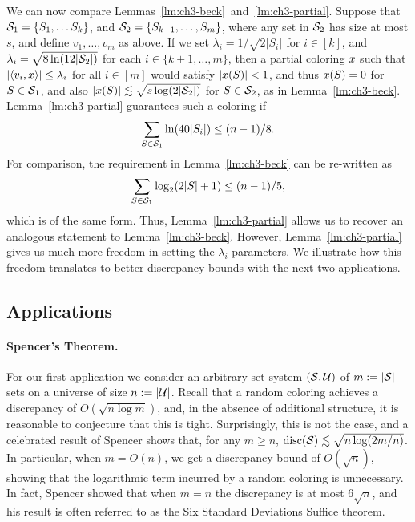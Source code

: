 We can now compare
Lemmas~\ref{lm:ch3-beck}~and~\ref{lm:ch3-partial}. Suppose that
$\mathcal{S}_1 = \{S_1, \ldots S_k\}$, and $\mathcal{S}_2 = \{S_{k+1}, \ldots, S_m\}$,
where any set in $\mathcal{S}_2$ has size at most $s$, and define
$v_1, \ldots, v_m$ as above. If we set
$\lambda_i = 1/\sqrt{2|S_i|}$ for $i \in [k]$, and
$\lambda_i = \sqrt{8\ln(12|\mathcal{S}_2|)}$ for each $i \in \{k+1, \ldots, m\}$, then a partial
coloring $x$ such that $|\langle v_i,x\rangle| \le \lambda_i$ for all
$i \in [m]$ would satisfy $|x(S)| < 1$, and thus
$x(S) = 0$ for $S \in \mathcal{S}_1$, and also
$|x(S)| \lesssim \sqrt{s \log(2|\mathcal{S}_2|)}$ for $S \in \mathcal{S}_2$, as
in Lemma~\ref{lm:ch3-beck}. Lemma~\ref{lm:ch3-partial} guarantees such
a coloring if
\[
  \sum_{S \in \mathcal{S}_1} \ln(40|S_i|) \le (n-1)/8.
\]
For comparison, the requirement in Lemma~\ref{lm:ch3-beck}
can be re-written as
\[
  \sum_{S \in \mathcal{S}_1} \log_2(2|S| + 1) \le (n-1)/5,
\]
which is of the same form. Thus,  Lemma~\ref{lm:ch3-partial} allows us
to recover an analogous statement to
Lemma~\ref{lm:ch3-beck}. However, Lemma~\ref{lm:ch3-partial}  gives
us much more freedom in setting the $\lambda_i$ parameters. We
illustrate how this freedom translates to better discrepancy bounds
with the next two applications.

\subsection{Applications}


\paragraph{Spencer's Theorem.}
For our first application we consider an arbitrary set system
\((\mathcal{S}, \mathcal{U})\) of \(m := |\mathcal{S}|\) sets on a universe of size \(n
:= |\mathcal{U}|\). Recall that a random coloring achieves a discrepancy
of \(O(\sqrt{n \log m})\), and, in the absence of additional structure,
it is reasonable to conjecture that this is tight. Surprisingly, this
is not the case, and a celebrated result of Spencer shows that, for
any \(m \ge n\),
\(\operatorname{disc}(\mathcal{S}) \lesssim \sqrt{n \log(2m/n)}\). In particular, when $m=O(n)$, we get a discrepancy bound of \(O(\sqrt{n})\),
showing that the logarithmic term incurred by a random coloring is
unnecessary. In fact, Spencer showed that when \(m = n\) the
discrepancy is at most \(6\sqrt{n}\), and his result is often
referred to as the Six Standard Deviations Suffice theorem.

